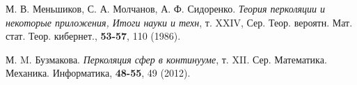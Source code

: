 \begin{thebibliography}{99}

М. В. Меньшиков, С. А. Молчанов, А. Ф. Сидоренко. \emph{Теория перколяции и некоторые приложения, Итоги науки и техн}, т. XXIV, Сер. Теор. вероятн. Мат. стат. Теор. кибернет.,   \textbf{53-57}, 110 (1986).


М. M. Бузмакова. \emph{Перколяция сфер в континууме}, т. XII. Сер. Математика. Механика. Информатика, \textbf{48-55}, 49 (2012).

\end{thebibliography}
